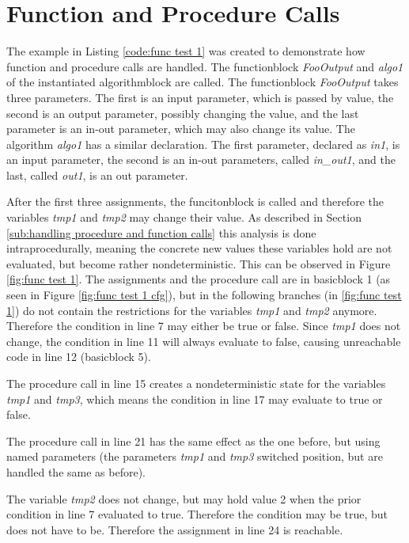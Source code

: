 \section{Function and Procedure Calls}
The example in Listing \ref{code:func test 1} was created to demonstrate how function and procedure calls are handled. The functionblock \emph{FooOutput} and \emph{algo1} of the instantiated algorithmblock are called. The functionblock \emph{FooOutput} takes three parameters. The first is an input parameter, which is passed by value, the second is an output parameter, possibly changing the value, and the last parameter is an in-out parameter, which may also change its value.
The algorithm \emph{algo1} has a similar declaration. The first parameter, declared as \emph{in1}, is an input parameter, the second is an in-out parameters, called \emph{in\_out1}, and the last, called \emph{out1}, is an out parameter.

After the first three assignments, the funcitonblock is called and therefore the variables \emph{tmp1} and \emph{tmp2} may change their value. As described in Section \ref{sub:handling procedure and function calls} this analysis is done intraprocedurally, meaning the concrete new values these variables hold are not evaluated, but become rather nondeterministic. This can be observed in Figure \ref{fig:func test 1}. The assignments and the procedure call are in basicblock 1 (as seen in Figure \ref{fig:func test 1 cfg}), but in the following branches (in \ref{fig:func test 1}) do not contain the restrictions for the variables \emph{tmp1} and \emph{tmp2} anymore. Therefore the condition in line 7 may either be true or false.
Since \emph{tmp1} does not change,  the condition in line 11 will always evaluate to false, causing unreachable code in line 12 (basicblock 5).

The procedure call in line 15 creates a nondeterministic state for the variables \emph{tmp1} and \emph{tmp3}, which means the condition in line 17 may evaluate to true or false.

The procedure call in line 21 has the same effect as the one before, but using named parameters (the parameters \emph{tmp1} and \emph{tmp3} switched position, but are handled the same as before).

The variable \emph{tmp2} does not change, but may hold value 2 when the prior condition in line 7 evaluated to true. Therefore the condition may be true, but does not have to be. Therefore the assignment in line 24 is reachable. 

